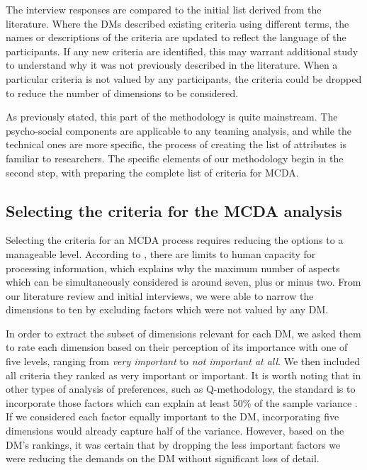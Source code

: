 
The interview responses are compared to the initial list derived from the
literature. Where the DMs described existing criteria using different terms,
the names or descriptions of the criteria are updated to reflect the 
language of the participants. If any new criteria are identified, this
may warrant additional study to understand why it was not previously
described in the literature. When a particular criteria is not valued by
any participants, the criteria could be dropped to reduce the number of
dimensions to be considered.

As previously stated, this part of the methodology is quite mainstream. The psycho-social components are applicable to any teaming analysis, and while the technical ones are more specific, the process of creating the list of attributes is familiar to researchers. The specific elements of our methodology begin in the second step, with preparing the complete list of criteria for MCDA.

\subsection{Selecting the criteria for the MCDA analysis}

Selecting the criteria for an MCDA process requires reducing the options to a manageable level.  According to \cite{mil56}, there are limits to human capacity for processing information, which explains why the maximum number of aspects which can be simultaneously considered is around seven, plus or minus two. From our literature review and initial interviews, we were able to narrow the dimensions to ten by excluding factors which were not valued by any DM.

In order to extract the subset of dimensions relevant for each DM, we asked them to rate each dimension based on their perception of its importance with one of five levels, ranging from {\em very important} to {\em not important at all}. We then included all criteria they ranked as very important or important. It is worth noting that in other types of analysis of preferences, such as Q-methodology, the standard is to incorporate those factors which can explain at least 50\% of the sample variance \citep{wingreen:2005:assessing}. If we considered each factor equally important to the DM, incorporating five dimensions would already capture half of the variance. However, based on the DM's rankings, it was certain that by dropping the less important factors we were reducing the demands on the DM without significant loss of detail.


